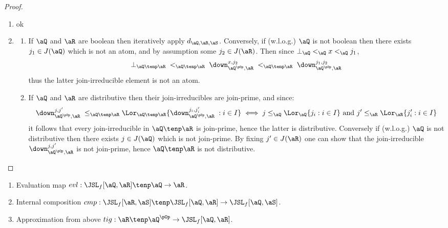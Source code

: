 \documentclass{article}
\begin{document}
\begin{proof}
\item
\begin{enumerate}
\item
ok
\item
\begin{enumerate}
\item
If $\aQ$ and $\aR$ are boolean then iteratively apply $d_{\aQ,\aR,\aS}$. Conversely, if (w.l.o.g.) $\aQ$ is not boolean then there exists $j_1 \in J(\aQ)$ which is not an atom, and by assumption some $j_2 \in J(\aR)$. Then since $\bot_\aQ <_\aQ x <_\aQ j_1$, 
\[
\bot_{\aQ \tenp \aR} \; <_{\aQ \tenp \aR} \; \down_{\aQ^{\pOp},\aR}^{x,j_2} \; <_{\aQ \tenp \aR} \; \down_{\aQ^{\pOp},\aR}^{j_1,j_2}
\]
thus the latter join-irreducible element is not an atom.

\item
If $\aQ$ and $\aR$ are distributive then their join-irreducibles are join-prime, and since:
\[
\down_{\aQ^{\pOp},\aR}^{j,j'} \; \leq_{\aQ \tenp \aR} 
\Lor_{\aQ \tenp \aR} \{ \down_{\aQ^{\pOp},\aR}^{j_i,j'_i} \; : i \in I  \}
\iff 
j \leq_\aQ \Lor_\aQ \{ j_i : i \in I \}
\text{ and }
j' \leq_\aR \Lor_\aR \{ j'_i : i \in I \}
\]
it follows that every join-irreducible in $\aQ \tenp \aR$ is join-prime, hence the latter is distributive. Conversely if (w.l.o.g.) $\aQ$ is not distributive then there exists $j \in J(\aQ)$ which is not join-prime. By fixing $j' \in J(\aR)$ one can show that the join-irreducible $\down_{\aQ^{\pOp},\aR}^{j,j'}$ is not join-prime, hence  $\aQ \tenp \aR$ is not distributive.
\end{enumerate}
\end{enumerate}
\end{proof}


\begin{example}
\item
\begin{enumerate}
\item
Evaluation map $evl : \JSL_f[\aQ,\aR] \tenp \aQ \to \aR$.
\item
Internal composition $cmp : \JSL_f[\aR,\aS] \tenp \JSL_f[\aQ,\aR] \to \JSL_f[\aQ,\aS]$.
\item
Approximation from above $tig : \aR \tenp \aQ^{\pOp} \to \JSL_f[\aQ,\aR]$. \endbox
\end{enumerate}
\end{example}

\smallskip
\end{document}
